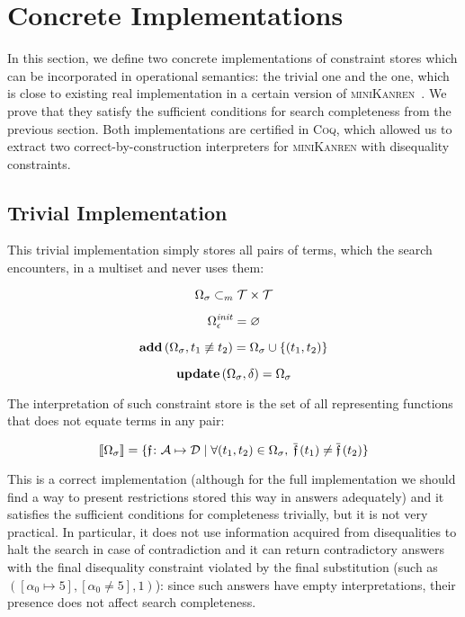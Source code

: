 \section{Concrete Implementations}
\label{sec:implementations}

In this section, we define two concrete implementations of constraint stores which can be incorporated in operational semantics: the trivial one and the one, which is close to existing real implementation in a certain version of \textsc{miniKanren}~\cite{CKanren}. We prove that they satisfy the sufficient conditions for search completeness from the previous section. Both implementations are certified in \textsc{Coq}, which allowed us to extract two correct-by-construction interpreters for \textsc{miniKanren} with
disequality constraints.

\subsection{Trivial Implementation}

This trivial implementation simply stores all pairs of terms, which the search encounters, in a multiset and never uses them:

\[ \Omega_\sigma \subset_m \mathcal{T} \times \mathcal{T} \]

\[ \Omega_\epsilon^{\mathit{init}} = \varnothing \]

\[ \mathbf{add}\,(\Omega_\sigma, t_1 \not\equiv t_2) = \Omega_\sigma \cup \{(t_1, t_2)\} \]

\[ \mathbf{update}\,(\Omega_\sigma, \delta) = \Omega_\sigma \]

The interpretation of such constraint store is the set of all representing functions that does not equate terms in any pair:

\[ \llbracket{\Omega_\sigma}\rrbracket = \{\mathfrak{f} \colon \mathcal{A}\mapsto\mathcal{D} \mid \forall (t_1, t_2) \in \Omega_\sigma, \; \overline{\mathfrak{f}}\,(t_1) \neq \overline{\mathfrak{f}}\,(t_2)\} \]

This is a correct implementation (although for the full implementation we should find a way to present restrictions stored this way
in answers adequately) and it satisfies the sufficient conditions for completeness trivially, but it is not very practical.
In particular, it does not use information acquired from disequalities to halt the search in case of contradiction and it can return contradictory answers with the final disequality constraint violated by the final substitution (such as $([\alpha_0 \mapsto 5], [\alpha_0 \neq 5], 1)$): since such answers have empty interpretations, their presence does not affect search completeness.

